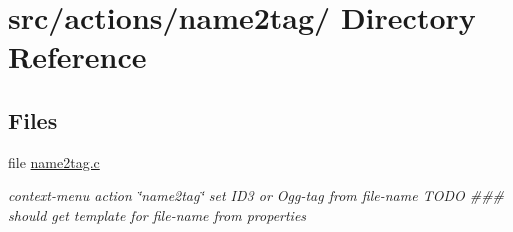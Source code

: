 \hypertarget{dir_000034}{
\section{src/actions/name2tag/ Directory Reference}
\label{dir_000034}
}
\subsection*{Files}
\begin{CompactItemize}
\item 
file \hyperlink{name2tag_8c}{name2tag.c}
\begin{CompactList}\small\item\em context-menu action \char`\"{}name2tag\char`\"{} set ID3 or Ogg-tag from file-name TODO \#\#\# should get template for file-name from properties \item\end{CompactList}

\end{CompactItemize}
